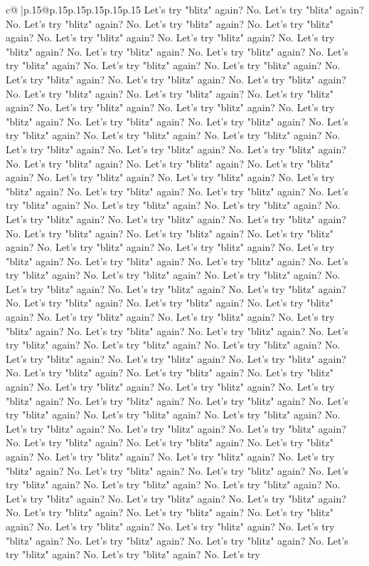 \documentclass{article}
\begin{document}
{\begin{supertabular}{c@{$\;$}|p{.15\linewidth}@{}p{.15\linewidth}p{.15\linewidth}p{.15\linewidth}p{.15\linewidth}p{.15\linewidth}}
{{{Let's try "blitz" again? No. Let's try "blitz" again? No. Let's try "blitz" again? No. Let's try "blitz" again? No. Let's try "blitz" again? No. Let's try "blitz" again? No. Let's try "blitz" again? No. Let's try "blitz" again? No. Let's try "blitz" again? No. Let's try "blitz" again? No. Let's try "blitz" again? No. Let's try "blitz" again? No. Let's try "blitz" again? No. Let's try "blitz" again? No. Let's try "blitz" again? No. Let's try "blitz" again? No. Let's try "blitz" again? No. Let's try "blitz" again? No. Let's try "blitz" again? No. Let's try "blitz" again? No. Let's try "blitz" again? No. Let's try "blitz" again? No. Let's try "blitz" again? No. Let's try "blitz" again? No. Let's try "blitz" again? No. Let's try "blitz" again? No. Let's try "blitz" again? No. Let's try "blitz" again? No. Let's try "blitz" again? No. Let's try "blitz" again? No. Let's try "blitz" again? No. Let's try "blitz" again? No. Let's try "blitz" again? No. Let's try "blitz" again? No. Let's try "blitz" again? No. Let's try "blitz" again? No. Let's try "blitz" again? No. Let's try "blitz" again? No. Let's try "blitz" again? No. Let's try "blitz" again? No. Let's try "blitz" again? No. Let's try "blitz" again? No. Let's try "blitz" again? No. Let's try "blitz" again? No. Let's try "blitz" again? No. Let's try "blitz" again? No. Let's try "blitz" again? No. Let's try "blitz" again? No. Let's try "blitz" again? No. Let's try "blitz" again? No. Let's try "blitz" again? No. Let's try "blitz" again? No. Let's try "blitz" again? No. Let's try "blitz" again? No. Let's try "blitz" again? No. Let's try "blitz" again? No. Let's try "blitz" again? No. Let's try "blitz" again? No. Let's try "blitz" again? No. Let's try "blitz" again? No. Let's try "blitz" again? No. Let's try "blitz" again? No. Let's try "blitz" again? No. Let's try "blitz" again? No. Let's try "blitz" again? No. Let's try "blitz" again? No. Let's try "blitz" again? No. Let's try "blitz" again? No. Let's try "blitz" again? No. Let's try "blitz" again? No. Let's try "blitz" again? No. Let's try "blitz" again? No. Let's try "blitz" again? No. Let's try "blitz" again? No. Let's try "blitz" again? No. Let's try "blitz" again? No. Let's try "blitz" again? No. Let's try "blitz" again? No. Let's try "blitz" again? No. Let's try "blitz" again? No. Let's try "blitz" again? No. Let's try "blitz" again? No. Let's try "blitz" again? No. Let's try "blitz" again? No. Let's try "blitz" again? No. Let's try "blitz" again? No. Let's try "blitz" again? No. Let's try "blitz" again? No. Let's try "blitz" again? No. Let's try "blitz" again? No. Let's try "blitz" again? No. Let's try "blitz" again? No. Let's try "blitz" again? No. Let's try "blitz" again? No. Let's try "blitz" again? No. Let's try "blitz" again? No. Let's try "blitz" again? No. Let's try "blitz" again? No. Let's try "blitz" again? No. Let's try "blitz" again? No. Let's try "blitz" again? No. Let's try "blitz" again? No. Let's try "blitz" again? No. Let's try "blitz" again? No. Let's try "blitz" again? No. Let's try "blitz" again? No. Let's try "blitz" again? No. Let's try "blitz" again? No. Let's try "blitz" again? No. Let's try "blitz" again? No. Let's try }}}
\end{supertabular}}
\end{document}
